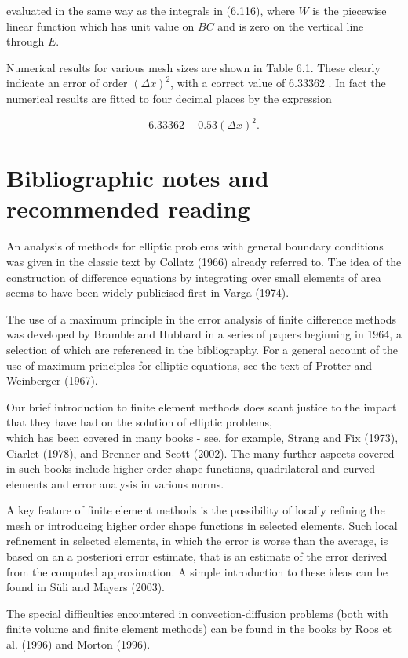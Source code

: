 \documentclass[10pt]{article}
\begin{document}
evaluated in the same way as the integrals in (6.116), where \(W\) is the piecewise linear function which has unit value on \(B C\) and is zero on the vertical line through \(E\).

Numerical results for various mesh sizes are shown in Table 6.1. These clearly indicate an error of order \((\Delta x)^{2}\), with a correct value of 6.33362 . In fact the numerical results are fitted to four decimal places by the expression

\[
6.33362+0.53(\Delta x)^{2} .
\]

\section*{Bibliographic notes and recommended reading}
An analysis of methods for elliptic problems with general boundary conditions was given in the classic text by Collatz (1966) already referred to. The idea of the construction of difference equations by integrating over small elements of area seems to have been widely publicised first in Varga (1974).

The use of a maximum principle in the error analysis of finite difference methods was developed by Bramble and Hubbard in a series of papers beginning in 1964, a selection of which are referenced in the bibliography. For a general account of the use of maximum principles for elliptic equations, see the text of Protter and Weinberger (1967).

Our brief introduction to finite element methods does scant justice to the impact that they have had on the solution of elliptic problems,\\
which has been covered in many books - see, for example, Strang and Fix (1973), Ciarlet (1978), and Brenner and Scott (2002). The many further aspects covered in such books include higher order shape functions, quadrilateral and curved elements and error analysis in various norms.

A key feature of finite element methods is the possibility of locally refining the mesh or introducing higher order shape functions in selected elements. Such local refinement in selected elements, in which the error is worse than the average, is based on an a posteriori error estimate, that is an estimate of the error derived from the computed approximation. A simple introduction to these ideas can be found in Süli and Mayers (2003).

The special difficulties encountered in convection-diffusion problems (both with finite volume and finite element methods) can be found in the books by Roos et al. (1996) and Morton (1996).
\end{document}
